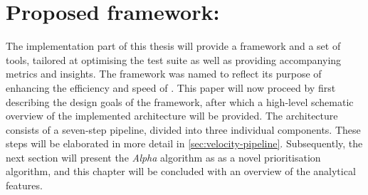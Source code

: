 
\chapter{Proposed framework: \velocity{}}
\label{ch:velocity}
The implementation part of this thesis will provide a framework and a set of tools, tailored at optimising the test suite as well as providing accompanying metrics and insights. The framework was named \velocity{} to reflect its purpose of enhancing the efficiency and speed of \CI{}. This paper will now proceed by first describing the design goals of the framework, after which a high-level schematic overview of the implemented architecture will be provided. The architecture consists of a seven-step pipeline, divided into three individual components. These steps will be elaborated in more detail in \cref{sec:velocity-pipeline}. Subsequently, the next section will present the \emph{Alpha} algorithm as as a novel prioritisation algorithm, and this chapter will be concluded with an overview of the analytical features.


\clearpage

\clearpage

\clearpage

\clearpage
